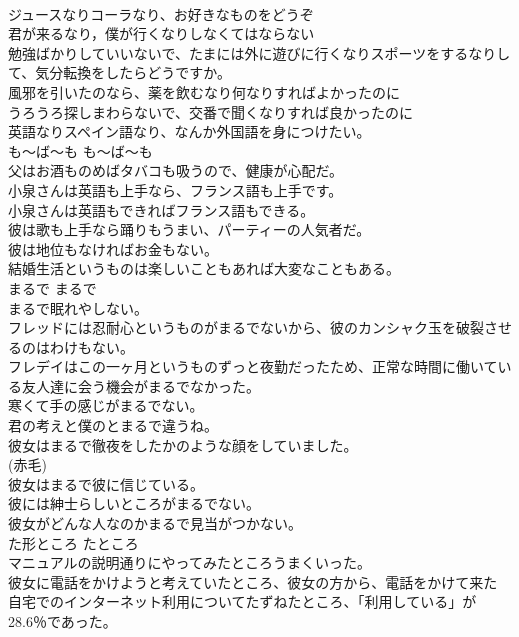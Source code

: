 \documentclass[8pt]{extreport}
\begin{document}
\begin{CJK}{UTF8}{min}
\\	ジュースなりコーラなり、お好きなものをどうぞ   
\\	君が来るなり，僕が行くなりしなくてはならない   
\\	勉強ばかりしていいないで、たまには外に遊びに行くなりスポーツをするなりして、気分転換をしたらどうですか。   
\\	風邪を引いたのなら、薬を飲むなり何なりすればよかったのに   
\\	うろうろ探しまわらないで、交番で聞くなりすれば良かったのに   
\\	英語なりスペイン語なり、なんか外国語を身につけたい。   
\\	も〜ば〜も	も〜ば〜も	
\\	父はお酒ものめばタバコも吸うので、健康が心配だ。  
\\	小泉さんは英語も上手なら、フランス語も上手です。  
\\	小泉さんは英語もできればフランス語もできる。  
\\	彼は歌も上手なら踊りもうまい、パーティーの人気者だ。  
\\	彼は地位もなければお金もない。  
\\	結婚生活というものは楽しいこともあれば大変なこともある。  
\\	まるで	まるで	
\\	まるで眠れやしない。  
\\	フレッドには忍耐心というものがまるでないから、彼のカンシャク玉を破裂させるのはわけもない。  
\\	フレデイはこの一ヶ月というものずっと夜勤だったため、正常な時間に働いている友人達に会う機会がまるでなかった。  
\\	寒くて手の感じがまるでない。  
\\	君の考えと僕のとまるで違うね。  
\\	彼女はまるで徹夜をしたかのような顔をしていました。   
\\	(赤毛)
\\	彼女はまるで彼に信じている。  
\\	彼には紳士らしいところがまるでない。   
\\	彼女がどんな人なのかまるで見当がつかない。   
\\	た形ところ	たところ	
\\	マニュアルの説明通りにやってみたところうまくいった。  
\\	彼女に電話をかけようと考えていたところ、彼女の方から、電話をかけて来た  
\\	自宅でのインターネット利用についてたずねたところ、「利用している」が28.6％であった。  

\end{CJK}
\end{document}
